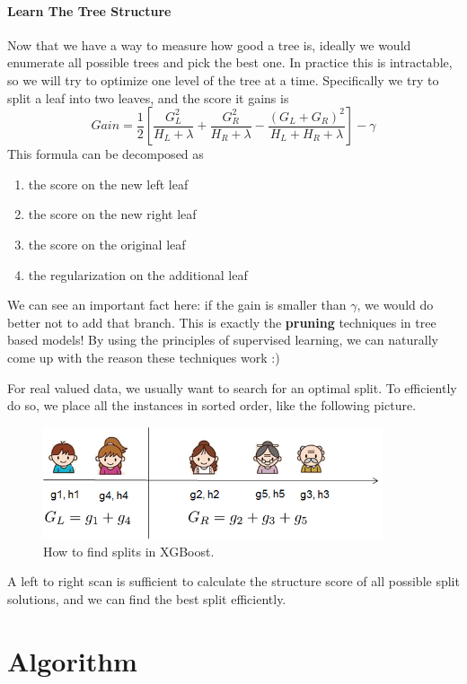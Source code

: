 \documentclass[a3paper, 12pt]{book} %
\begin{document}
\subsection{Learn The Tree Structure}
Now that we have a way to measure how good a tree is, ideally we would enumerate all possible trees and pick the best one. In practice this is intractable, so we will try to optimize one level of the tree at a time. Specifically we try to split a leaf into two leaves, and the score it gains is
\begin{equation}
Gain = \frac{1}{2} \left[\frac{G_L^2}{H_L+\lambda}+\frac{G_R^2}{H_R+\lambda}-\frac{(G_L+G_R)^2}{H_L+H_R+\lambda}\right] - \gamma
\end{equation}
This formula can be decomposed as 
\begin{enumerate}
	\item the score on the new left leaf
	\item the score on the new right leaf
	\item the score on the original leaf
	\item the regularization on the additional leaf
\end{enumerate}
We can see an important fact here: if the gain is smaller than $\gamma$, we would do better not to add that branch. This is exactly the \textbf{pruning} techniques in tree based models! By using the principles of supervised learning, we can naturally come up with the reason these techniques work :)

For real valued data, we usually want to search for an optimal split. To efficiently do so, we place all the instances in sorted order, like the following picture.
\begin{figure}[htpb]
	\centering
	\includegraphics[width=10cm]{figures/split_find.png}
	\caption{How to find splits in XGBoost.}
	\label{fig:boat1}
\end{figure}
A left to right scan is sufficient to calculate the structure score of all possible split solutions, and we can find the best split efficiently.


\part{Algorithm}
\end{document}
